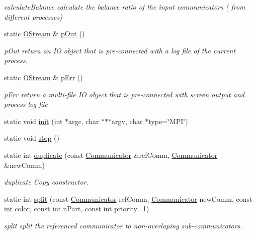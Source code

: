 \begin{DoxyCompactItemize}
\begin{DoxyCompactList}\small\item\em calculateBalance calculate the balance ratio of the input communicators ( from different processes) \item\end{DoxyCompactList}\item 
static \hyperlink{classHSF_1_1OStream}{OStream} \& \hyperlink{classHSF_1_1COMM_a34972039314a2f48f084316f6c2a02bb}{pOut} ()
\begin{DoxyCompactList}\small\item\em pOut return an IO object that is pre-\/connected with a log file of the current process. \item\end{DoxyCompactList}\item 
static \hyperlink{classHSF_1_1OStream}{OStream} \& \hyperlink{classHSF_1_1COMM_ad3b168a9b2f1a465334f5c161d8fb67b}{pErr} ()
\begin{DoxyCompactList}\small\item\em pErr return a multi-\/file IO object that is pre-\/connected with screen output and process log file \item\end{DoxyCompactList}\item 
static void \hyperlink{classHSF_1_1COMM_a4e1c8c801a57bb3f57e78e89ecbe98a4}{init} (int $\ast$argc, char $\ast$$\ast$$\ast$argv, char $\ast$type=\char`\"{}MPI\char`\"{})
\item 
static void \hyperlink{classHSF_1_1COMM_a4e6c81ad1d5471ea0b9cf1ff00afb041}{stop} ()
\item 
static int \hyperlink{classHSF_1_1COMM_a093162ff2492f8f27d86cb998ff52f10}{duplicate} (const \hyperlink{classHSF_1_1Communicator}{Communicator} \&refComm, \hyperlink{classHSF_1_1Communicator}{Communicator} \&newComm)
\begin{DoxyCompactList}\small\item\em duplicate Copy constructor. \item\end{DoxyCompactList}\item 
static int \hyperlink{classHSF_1_1COMM_a1e80b3cf7e5fdf42c7e4461adfa116bc}{split} (const \hyperlink{classHSF_1_1Communicator}{Communicator} refComm, \hyperlink{classHSF_1_1Communicator}{Communicator} newComm, const int color, const int nPart, const int priority=1)
\begin{DoxyCompactList}\small\item\em split split the referenced communicator to non-\/overlaping sub-\/communicators. \item\end{DoxyCompactList}\item 

\end{DoxyCompactItemize}
